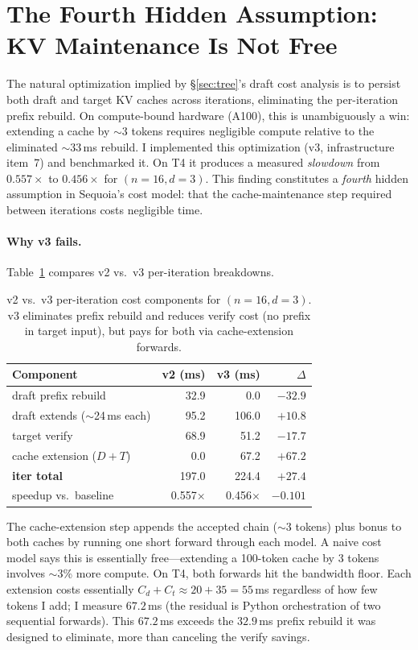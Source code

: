 \documentclass[letterpaper,twocolumn,10pt]{article}
\begin{document}
\section{The Fourth Hidden Assumption: KV Maintenance Is Not Free}
\label{sec:fourth}

The natural optimization implied by \S\ref{sec:tree}'s draft cost analysis is to persist both draft and target KV caches across iterations, eliminating the per-iteration prefix rebuild.
On compute-bound hardware (A100), this is unambiguously a win: extending a cache by $\sim$3 tokens requires negligible compute relative to the eliminated $\sim$33\,ms rebuild.
I implemented this optimization (v3, infrastructure item~7) and benchmarked it.
On T4 it produces a measured \emph{slowdown} from $0.557\times$ to $0.456\times$ for $(n{=}16, d{=}3)$.
This finding constitutes a \emph{fourth} hidden assumption in Sequoia's cost model: that the cache-maintenance step required between iterations costs negligible time.

\paragraph{Why v3 fails.}
Table~\ref{tab:v2v3} compares v2 vs.\ v3 per-iteration breakdowns.

\begin{table}[t]
\centering
\small
\caption{v2 vs.\ v3 per-iteration cost components for $(n{=}16, d{=}3)$. v3 eliminates prefix rebuild and reduces verify cost (no prefix in target input), but pays for both via cache-extension forwards.}
\label{tab:v2v3}
\smallskip
\begin{tabular}{@{}lrrr@{}}
\toprule
Component & v2 (ms) & v3 (ms) & $\Delta$ \\
\midrule
draft prefix rebuild & 32.9 & 0.0 & $-32.9$ \\
draft extends ($\sim$24\,ms each) & 95.2 & 106.0 & $+10.8$ \\
target verify          & 68.9 & 51.2 & $-17.7$ \\
cache extension ($D + T$)  & 0.0 & 67.2 & $+67.2$ \\
\midrule
\textbf{iter total}    & 197.0 & 224.4 & $+27.4$ \\
\midrule
speedup vs.\ baseline  & 0.557$\times$ & 0.456$\times$ & $-0.101$ \\
\bottomrule
\end{tabular}
\end{table}

The cache-extension step appends the accepted chain ($\sim$3 tokens) plus bonus to both caches by running one short forward through each model.
A naive cost model says this is essentially free---extending a 100-token cache by 3 tokens involves $\sim$3\% more compute.
On T4, both forwards hit the bandwidth floor.
Each extension costs essentially $C_d + C_t \approx 20 + 35 = 55$\,ms regardless of how few tokens I add; I measure $67.2$\,ms (the residual is Python orchestration of two sequential forwards).
This $67.2$\,ms exceeds the $32.9$\,ms prefix rebuild it was designed to eliminate, more than canceling the verify savings.
\end{document}
